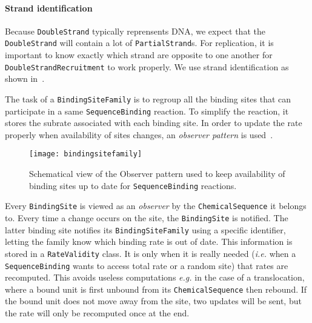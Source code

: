 \paragraph{Strand identification} Because \texttt{DoubleStrand} typically reprensents DNA, we expect that the \texttt{DoubleStrand} will contain a lot of \texttt{PartialStrand}s. For replication, it is important to know exactly which strand are opposite to one another for \texttt{DoubleStrandRecruitment} to work properly. We use strand identification as shown in~.



The task of a \texttt{BindingSiteFamily} is to regroup all the binding sites that can participate in a same \texttt{SequenceBinding} reaction. To simplify the reaction, it stores the subrate associated with each binding site. In order to update the rate properly when availability of sites changes, an \emph{observer pattern} is used~. 

\begin{figure}[!h]
  \centering
  \texttt{[image: bindingsitefamily]}
  \caption{Schematical view of the Observer pattern used to keep availability of binding sites up to date for \texttt{SequenceBinding} reactions.}
  \label{fig:det_bsf}
\end{figure}

Every \texttt{BindingSite} is viewed as an \emph{observer} by the \texttt{ChemicalSequence} it belongs to. Every time a change occurs on the site, the \texttt{BindingSite} is notified. The latter binding site notifies its \texttt{BindingSiteFamily} using a specific identifier, letting the family know which binding rate is out of date. This information is stored in a \texttt{RateValidity} class. It is only when it is really needed (\textit{i.e.} when a \texttt{SequenceBinding} wants to access total rate or a random site) that rates are recomputed. This avoids useless computations \textit{e.g.} in the case of a translocation, where a bound unit is first unbound from its \texttt{ChemicalSequence} then rebound. If the bound unit does not move away from the site, two updates will be sent, but the rate will only be recomputed once at the end.
